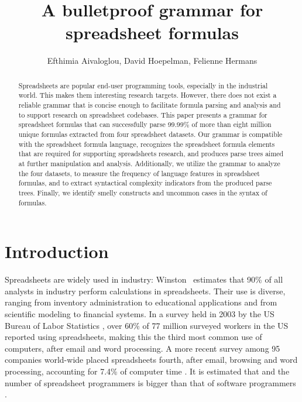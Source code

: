 \documentclass[times]{smrauth}
\begin{document}

\title{A bulletproof grammar for spreadsheet formulas}

\author{Efthimia Aivaloglou\corrauth, David Hoepelman, Felienne Hermans}

\address{Software Engineering Research Group, Delft University of Technology, Mekelweg 4, 2628 CD, Delft, The Netherlands}


\begin{abstract}
Spreadsheets are popular end-user programming tools, especially in the industrial world. This makes them interesting research targets. However, there does not exist a reliable grammar that is concise enough to facilitate formula parsing and analysis and to support research on spreadsheet codebases.
This paper presents a grammar for spreadsheet formulas that can successfully parse 99.99\% of more than eight million unique formulas extracted from four spreadsheet datasets. Our grammar is compatible with the spreadsheet formula language, recognizes the spreadsheet formula elements that are required for supporting spreadsheets research, and produces parse trees aimed at further manipulation and analysis. 
Additionally, we utilize the grammar to analyze the four datasets, to measure the frequency of language features in spreadsheet formulas, and to extract syntactical complexity indicators from the produced parse trees.
Finally, we identify smelly constructs and uncommon cases in the syntax of formulas.
\end{abstract}


\maketitle

\section{Introduction}
Spreadsheets are widely used in industry: Winston~\cite{Wins2001} estimates that 90\% of all analysts in industry perform calculations in
spreadsheets. Their use is diverse, ranging from inventory administration to educational applications and from scientific
modeling to financial systems. In a survey held in 2003 by the US Bureau of Labor Statistics \cite{stats}, over 60\% of 77 million surveyed workers in the US reported using spreadsheets, making this the third most common use of computers, after email and word processing. A more recent survey among 95 companies world-wide placed spreadsheets fourth, after email, browsing and word processing, accounting for 7.4\% of computer time \cite{stats2}. It is estimated that 
and the number of spreadsheet programmers is bigger than that of software programmers \cite{DBLP:conf/vl/ScaffidiSM05, SANERAll}. 
\end{document}
